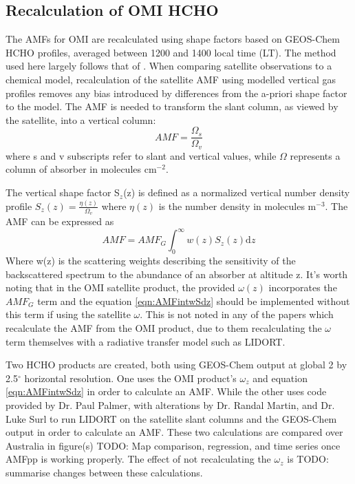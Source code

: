   \subsection{Recalculation of OMI HCHO}
    \label{BioIsop:omiRecalc}
    The AMFs for OMI are recalculated using shape factors based on GEOS-Chem HCHO profiles, averaged between 1200 and 1400 local time (LT).
    The method used here largely follows that of \citet{Palmer2001}.
    When comparing satellite observations to a chemical model, recalculation of the satellite AMF using modelled vertical gas profiles removes any bias introduced by differences from the a-priori shape factor to the model.
    The AMF is needed to transform the slant column, as viewed by the satellite, into a vertical column:
    \begin{equation} \label{eqn:AMFratio}
    AMF = \frac{\Omega_s}{\Omega_v} %
    \end{equation}
    where s and v subscripts refer to slant and vertical values, while $\Omega$ represents a column of absorber in molecules cm$^{-2}$.
    
    The vertical shape factor S$_z$(z) is defined as a normalized vertical number density profile $S_z(z) = \frac{\eta(z)}{\Omega_v}$ where $\eta(z)$ is the number density in molecules m$^{-3}$. 
    The AMF can be expressed as
    \begin{equation} \label{eqn:AMFintwSdz}
    AMF = AMF_G \int_0^\infty w(z) S_z(z) \mathrm{d}z
    \end{equation}
    Where w(z) is the scattering weights describing the sensitivity of the backscattered spectrum to the abundance of an absorber at altitude z.
    It's worth noting that in the OMI satellite product, the provided $\omega(z)$ incorporates the $AMF_G$ term and the equation \ref{eqn:AMFintwSdz} should be implemented without this term if using the satellite $\omega$.
    This is not noted in any of the papers which recalculate the AMF from the OMI product, due to them recalculating the $\omega$ term themselves with a radiative transfer model such as LIDORT.
    
    Two HCHO products are created, both using GEOS-Chem output at global 2 by 2.5$^{\circ}$ horizontal resolution.
    One uses the OMI product's $\omega_z$ and equation \ref{eqn:AMFintwSdz} in order to calculate an AMF.
    While the other uses code provided by Dr. Paul Palmer, with alterations by Dr. Randal Martin, and Dr. Luke Surl to run LIDORT on the satellite slant columns and the GEOS-Chem output in order to calculate an AMF.
    These two calculations are compared over Australia in figure(s) TODO: Map comparison, regression, and time series once AMFpp is working properly.
    The effect of not recalculating the $\omega_z$ is TODO: summarise changes between these calculations.
    
